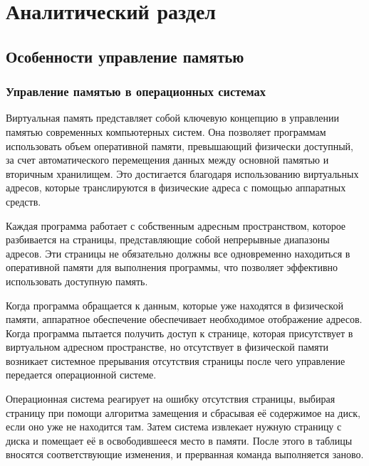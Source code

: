 \chapter{Аналитический раздел}

\section{Особенности управление памятью}

\subsection{Управление памятью в операционных системах}

Виртуальная память представляет собой ключевую концепцию в управлении памятью современных компьютерных систем.
Она позволяет программам использовать объем оперативной памяти, превышающий физически доступный, за счет автоматического перемещения данных между основной памятью
и вторичным хранилищем.
Это достигается благодаря использованию виртуальных адресов, которые транслируются в физические адреса с помощью аппаратных средств.

Каждая программа работает с собственным адресным пространством, которое разбивается на страницы, представляющие собой непрерывные диапазоны адресов.
Эти страницы не обязательно должны все одновременно находиться в оперативной памяти для выполнения программы, что позволяет эффективно использовать доступную память.

Когда программа обращается к данным, которые уже находятся в физической памяти, аппаратное обеспечение обеспечивает необходимое отображение адресов.
Когда программа пытается получить доступ к странице, которая присутствует в виртуальном адресном пространстве, но отсутствует в физической памяти возникает системное прерывания отсутствия страницы после чего управление передается операционной системе.

Операционная система реагирует на ошибку отсутствия страницы, выбирая страницу при помощи алгоритма замещения и сбрасывая её содержимое на диск, если оно уже не находится там. 
Затем система извлекает нужную страницу с диска и помещает её в освободившееся место в памяти. 
После этого в таблицы вносятся соответствующие изменения, и прерванная команда выполняется заново.

